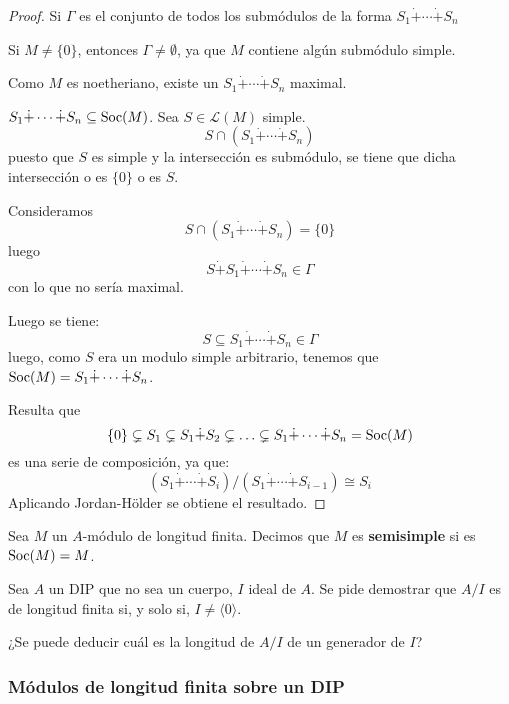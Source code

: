 \begin{proof}
  Si \(\Gamma\) es el conjunto de todos los submódulos de la forma
  \(
    S_1\dot{+}\cdots\dot{+} S_n
  \)

  Si \(M\neq\{0\}\), entonces \(\Gamma\neq\emptyset\), ya que \(M\)
  contiene algún submódulo simple.

  Como \(M\) es noetheriano, existe un
  \(
    S_1\dot{+}\cdots\dot{+} S_n
  \) maximal.

  \(
    S_1\dot{+}\cdots\dot{+} S_n\subseteq\operatorname{Soc}(M)
  \). Sea \(S\in\mathcal{L}(M)\) simple.
  \[
    S\cap(
    S_1\dot{+}\cdots\dot{+} S_n
    )
  \]
  puesto que \(S\) es simple y la intersección es submódulo, se tiene
  que dicha intersección o es \(\{0\}\) o es \(S\).

  Consideramos
  \[
    S\cap(
    S_1\dot{+}\cdots\dot{+} S_n
    ) = \{0\}
  \]
  luego
  \[
    S\dot{+}S_1\dot{+}\cdots\dot{+} S_n\in\Gamma
  \]
  con lo que no sería maximal.

  Luego se tiene:
  \[
    S\subseteq
    S_1\dot{+}\cdots\dot{+} S_n\in\Gamma
  \]
  luego, como \(S\) era un modulo simple arbitrario, tenemos que
  \(\operatorname{Soc}(M)=
    S_1\dot{+}\cdots\dot{+} S_n
  \).

  Resulta que
  \[
    \{0\}\subsetneq S_1\subsetneq S_1\dot{+} S_2\subsetneq\ldots
    \subsetneq
    S_1\dot{+}\cdots\dot{+} S_n=\operatorname{Soc}(M)
  \]
  es una serie de composición, ya que:
  \[
    (S_1\dot{+}\cdots\dot{+} S_i)/
    (S_1\dot{+}\cdots\dot{+} S_{i-1})\cong
    S_i
  \]
  Aplicando Jordan-Hölder se obtiene el resultado.
\end{proof}

\begin{df}
  Sea \(M\) un \(A\)-módulo de longitud finita. Decimos que \(M\) es \textbf{semisimple}
  si es \(\operatorname{Soc}(M)=M\).
\end{df}

\begin{ejercicio}
  Sea \(A\) un DIP que no sea un cuerpo,
  \(I\) ideal de \(A\). Se pide demostrar
  que \(A/I\) es de longitud finita si, y solo si, \(I\neq\langle 0\rangle\).
\end{ejercicio}

¿Se puede deducir cuál es la longitud de \(A/I\) de un generador de \(I\)?

\subsubsection{Módulos de longitud finita sobre un DIP}

